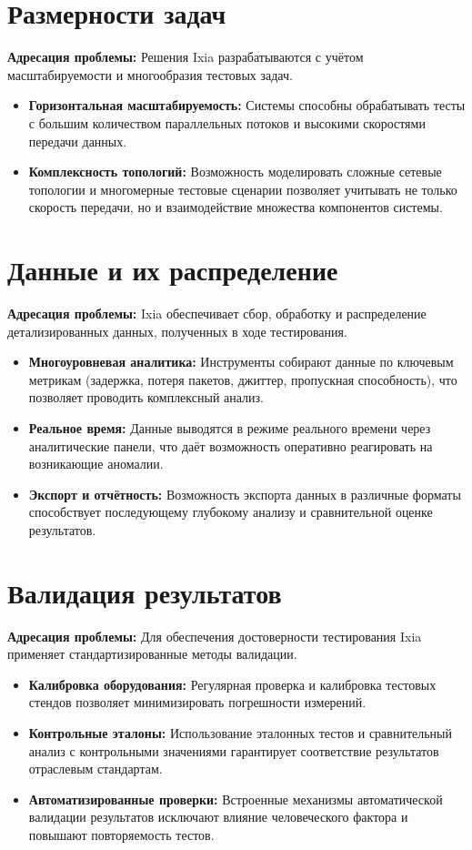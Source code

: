 \documentclass[12pt,a4paper]{article}
\begin{document}
\section{Размерности задач}
\textbf{Адресация проблемы:} Решения Ixia разрабатываются с учётом масштабируемости и многообразия тестовых задач.
\begin{itemize}[leftmargin=2em]
    \item \textbf{Горизонтальная масштабируемость:} Системы способны обрабатывать тесты с большим количеством параллельных потоков и высокими скоростями передачи данных.
    \item \textbf{Комплексность топологий:} Возможность моделировать сложные сетевые топологии и многомерные тестовые сценарии позволяет учитывать не только скорость передачи, но и взаимодействие множества компонентов системы.
\end{itemize}

\section{Данные и их распределение}
\textbf{Адресация проблемы:} Ixia обеспечивает сбор, обработку и распределение детализированных данных, полученных в ходе тестирования.
\begin{itemize}[leftmargin=2em]
    \item \textbf{Многоуровневая аналитика:} Инструменты собирают данные по ключевым метрикам (задержка, потеря пакетов, джиттер, пропускная способность), что позволяет проводить комплексный анализ.
    \item \textbf{Реальное время:} Данные выводятся в режиме реального времени через аналитические панели, что даёт возможность оперативно реагировать на возникающие аномалии.
    \item \textbf{Экспорт и отчётность:} Возможность экспорта данных в различные форматы способствует последующему глубокому анализу и сравнительной оценке результатов.
\end{itemize}

\section{Валидация результатов}
\textbf{Адресация проблемы:} Для обеспечения достоверности тестирования Ixia применяет стандартизированные методы валидации.
\begin{itemize}[leftmargin=2em]
    \item \textbf{Калибровка оборудования:} Регулярная проверка и калибровка тестовых стендов позволяет минимизировать погрешности измерений.
    \item \textbf{Контрольные эталоны:} Использование эталонных тестов и сравнительный анализ с контрольными значениями гарантирует соответствие результатов отраслевым стандартам.
    \item \textbf{Автоматизированные проверки:} Встроенные механизмы автоматической валидации результатов исключают влияние человеческого фактора и повышают повторяемость тестов.
\end{itemize}
\end{document}
